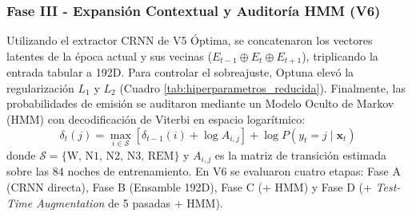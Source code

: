 \documentclass[conference]{IEEEtran}
\begin{document}
\subsubsection{Fase III - Expansión Contextual y Auditoría HMM (V6)}
Utilizando el extractor CRNN de V5 Óptima, se concatenaron los vectores latentes de la época actual y sus vecinas ($E_{t-1} \oplus E_t \oplus E_{t+1}$), triplicando la entrada tabular a 192D. Para controlar el sobreajuste, Optuna elevó la regularización $L_1$ y $L_2$ (Cuadro \ref{tab:hiperparametros_reducida}). Finalmente, las probabilidades de emisión se auditaron mediante un Modelo Oculto de Markov (HMM) con decodificación de Viterbi en espacio logarítmico:
\begin{equation}
\delta_t(j) = \max_{i \in \mathcal{S}} \left[\delta_{t-1}(i) + \log A_{i,j}\right] + \log P(y_t = j \mid \mathbf{x}_t)
\label{eq:viterbi}
\end{equation}
donde $\mathcal{S} = \{\text{W, N1, N2, N3, REM}\}$ y $A_{i,j}$ es la matriz de transición estimada sobre las 84 noches de entrenamiento. En V6 se evaluaron cuatro etapas: Fase A (CRNN directa), Fase B (Ensamble 192D), Fase C (+ HMM) y Fase D (+ \textit{Test-Time Augmentation} de 5 pasadas + HMM).

\begin{table}[htbp]
\centering
\caption{Evolución de Hiperparámetros del Ensamble LightGBM}
\label{tab:hiperparametros_reducida}
\end{table}
\end{document}
